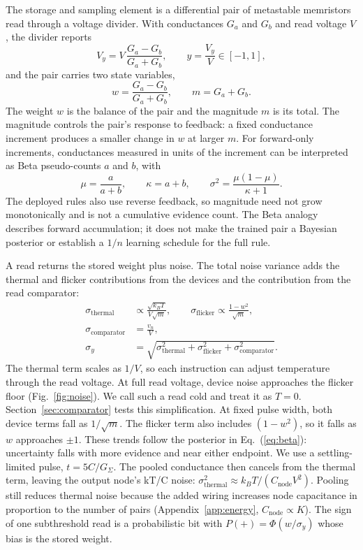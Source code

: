 \documentclass[reprint,amsmath,amssymb,aps,nofootinbib]{revtex4-2}
\newcommand{\kB}{k_{B}}
\begin{document}
The storage and sampling element is a differential pair of metastable
memristors read through a voltage divider. With conductances $G_a$
and $G_b$ and read voltage $V$, the divider reports
\begin{equation}
V_y = V\,\frac{G_a - G_b}{G_a + G_b}, \qquad
y = \frac{V_y}{V} \in [-1, 1],
\label{eq:divider}
\end{equation}
and the pair carries two state variables,
\begin{equation}
w = \frac{G_a - G_b}{G_a + G_b}, \qquad m = G_a + G_b .
\label{eq:wm}
\end{equation}
The weight $w$ is the balance of the pair and the magnitude $m$ is its
total. The magnitude controls the pair's response to feedback: a fixed
conductance increment produces a smaller change in $w$ at larger $m$.
For forward-only increments, conductances measured in units of the
increment can be interpreted as Beta pseudo-counts $a$ and $b$, with
\begin{equation}
\mu = \frac{a}{a+b}, \qquad \kappa = a+b, \qquad
\sigma^2 = \frac{\mu(1-\mu)}{\kappa+1}.
\label{eq:beta}
\end{equation}
The deployed rules also use reverse feedback, so magnitude need not
grow monotonically and is not a cumulative evidence count. The Beta
analogy describes forward accumulation; it does not make the trained
pair a Bayesian posterior or establish a $1/n$ learning schedule for
the full rule.

A read returns the stored weight plus noise. The total noise variance adds the thermal and flicker contributions from
the devices and the contribution from the read comparator:
\begin{align}
\sigma_{\mathrm{thermal}} &\propto \frac{\sqrt{\kB T}}{V\sqrt{m}},
\qquad
\sigma_{\mathrm{flicker}} \propto \frac{1 - w^2}{\sqrt{m}},
\nonumber \\
\sigma_{\mathrm{comparator}} &= \frac{v_n}{V},
\nonumber \\
\sigma_y &= \sqrt{\sigma_{\mathrm{thermal}}^2 +
                  \sigma_{\mathrm{flicker}}^2 +
                  \sigma_{\mathrm{comparator}}^2}.
\label{eq:noise}
\end{align}
The thermal term scales as $1/V$, so each instruction can adjust
temperature through the read voltage. At full read voltage, device noise
approaches the flicker floor (Fig.~\ref{fig:noise}). We call such a
read cold and treat it as $T = 0$. Section~\ref{sec:comparator} tests this simplification. At fixed pulse width, both device terms fall as $1/\sqrt{m}$. The
flicker term also includes $(1 - w^2)$, so it falls as $w$ approaches
$\pm1$. These trends follow the posterior in Eq.~(\ref{eq:beta}):
uncertainty falls with more evidence and near either endpoint. We use a settling-limited pulse, $t = 5C/G_\Sigma$. The pooled
conductance then cancels from the thermal term, leaving the output
node's kT/C noise: $\sigma^2_{\mathrm{thermal}} \approx \kB T /
(C_{\mathrm{node}} V^2)$. Pooling still reduces thermal noise because the added wiring increases
node capacitance in proportion to the number of pairs
(Appendix~\ref{app:energy}, $C_{\mathrm{node}} \propto K$). The sign of one subthreshold read is a
probabilistic bit with $P(+) = \Phi(w/\sigma_y)$ whose bias is the
stored weight.
\end{document}
